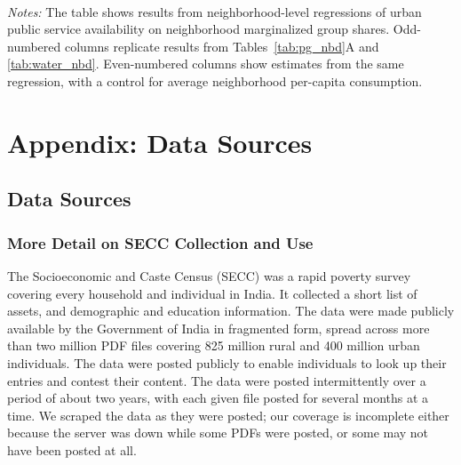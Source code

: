 \documentclass[12pt]{article}
\newcommand{\segpath}{/Users/f0018fb/Dropbox/tmp/segdata/out}
\begin{document}
  \clearpage
  
\begin{landscape}
  \begin{table}[H]
		\begin{center}
    \caption{Neighborhood-level Public Services and Marginalized Group Shares: \cnewline Estimates Controlling for Neighborhood Consumption}
    \label{tab:pg_ineq_w_controls}
		
    \end{center}
    \\
    \footnotesize{\noindent \textit{Notes:} The table shows results from neighborhood-level regressions of urban public service availability on neighborhood marginalized group shares. Odd-numbered columns replicate results from Tables~\ref{tab:pg_nbd}A and \ref{tab:water_nbd}. Even-numbered columns show estimates from the same regression, with a control for average neighborhood per-capita consumption.}
	\end{table}
\end{landscape}

\clearpage

  \section{Appendix: Data Sources} \label{sec:app_b}

  \subsection{Data Sources}
  \label{sec:app_data}
  \subsubsection{More Detail on SECC Collection and Use}
  
  The Socioeconomic and Caste Census (SECC) was a rapid poverty survey covering every household and individual in India. It collected a short list of assets, and demographic and education information. The data were made publicly available by the Government of India in fragmented form, spread across more than two million PDF files covering 825 million rural and 400 million urban individuals. The data were posted publicly to enable individuals to look up their entries and contest their content. The data were posted intermittently over a period of about two years, with each given file posted for several months at a time. We scraped the data as they were posted; our coverage is incomplete either because the server was down while some PDFs were posted, or some may not have been posted at all.
\end{document}
